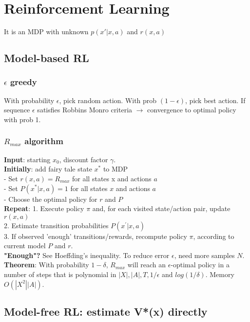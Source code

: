 \section{Reinforcement Learning}
It is an MDP with unknown $p(x'\vert x,a)$ and $r(x,a)$
\subsection{Model-based RL}

\subsubsection{$\epsilon$ greedy}
With probability $\epsilon$, pick random action. With prob $(1-\epsilon)$, pick best action. If sequence $\epsilon$ satisfies Robbins Monro criteria $\rightarrow$ convergence to optimal policy with prob 1.

\subsubsection{$R_{max}$ algorithm}
\textbf{Input}: starting $x_0$, discount factor $\gamma$.\\
\textbf{Initially}: add fairy tale state $x^*$ to MDP\\
- Set $r(x,a)=R_{max}$ for all states x and actions $a$\\
- Set $P(x^*|x,a)=1$ for all states $x$ and actions $a$\\
- Choose the optimal policy for $r$ and $P$\\
\textbf{Repeat}:
1. Execute policy $\pi$ and, for each visited state/action pair, update $r(x,a)$\\
2. Estimate transition probabilities $P(x^{'}|x,a)$\\
3. If observed 'enough' transitions/rewards, recompute policy $\pi$, according to current model $P$ and $r$.\\
\textbf{"Enough"?} See Hoeffding's inequality. To reduce error $\epsilon$, need more samples $N$.\\
\textbf{Theorem}: With probability $1-\delta$, $R_{max}$ will reach an $\epsilon$-optimal policy in a number of steps that is polynomial in $|X|, |A|, T, 1/\epsilon$ and $log(1/\delta)$. Memory $O(|X^2||A|)$. 

\subsection{Model-free RL: estimate V*(x) directly}
